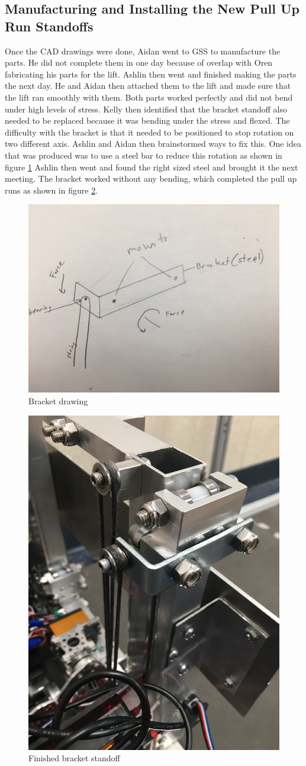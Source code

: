 \documentclass{article}
\begin{document}
\subsection{Manufacturing and Installing the New Pull Up Run Standoffs}
Once the CAD drawings were done, Aidan went to GSS to manufacture the parts. He did not complete them in one day because of overlap with Oren fabricating his parts for the lift. Ashlin then went and finished making the parts the next day. He and Aidan then attached them to the lift and made sure that the lift ran smoothly with them. Both parts worked perfectly and did not bend under high levels of stress. Kelly then identified that the bracket standoff also needed to be replaced because it was bending under the stress and flexed. The difficulty with the bracket is that it needed to be positioned to stop rotation on two different axis. Ashlin and Aidan then brainstormed ways to fix this. One idea that was produced was to use a steel bar to reduce this rotation as shown in figure \ref{fig: bracket} Ashlin then went and found the right sized steel and brought it the next meeting. The bracket worked without any bending, which completed the pull up runs as shown in figure \ref{fig: bracket2}.

\begin{figure}
    \centering
    \includegraphics[width= 0.4 \textwidth]{26_02-25/images/Bracket.jpg}
    \caption{Bracket drawing}
    \label{fig: bracket}
\end{figure}
\begin{figure}
    \centering
    \includegraphics[width= 0.3 \textwidth]{26_02-25/images/Bracket2.jpg}
    \caption{Finished bracket standoff}
    \label{fig: bracket2}
\end{figure}
\end{document}
